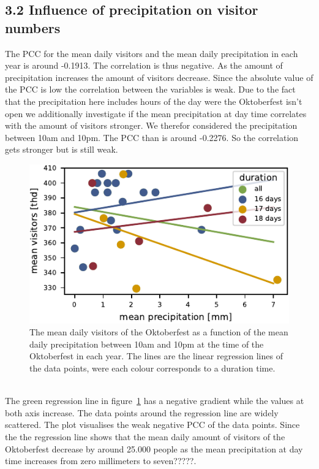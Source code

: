 \documentclass{article}
\theoremstyle{plain}
\theoremstyle{definition}
\theoremstyle{remark}
\begin{document}
\subsection*{3.2 Influence of precipitation on visitor numbers}
The PCC for the mean daily visitors and the mean daily precipitation in each year is around -0.1913. The correlation is thus negative. As the amount of precipitation increases the amount of visitors decrease. Since the absolute value of the PCC is low the correlation between the variables is weak. Due to the fact that the precipitation here includes hours of the day were the Oktoberfest isn't open we additionally investigate if the mean precipitation at day time correlates with the amount of visitors stronger. We therefor considered the precipitation between 10am and 10pm. The PCC than is around -0.2276. So the correlation gets stronger but is still weak.
\begin{figure}[ht]%
  \includegraphics{fig/totalprecipitation.pdf}
  \caption{The mean daily visitors of the Oktoberfest as a function of the mean daily precipitation between 10am and 10pm at the time of the Oktoberfest in each year. The lines are the linear regression lines of the data points, were each colour corresponds to a duration time.}
  \label{figure_precipitation}
\end{figure}\\
\noindent
The green regression line in figure~\ref{figure_precipitation} has a negative gradient while the values at both axis increase. The data points around the regression line are widely scattered. The plot visualises the weak negative PCC of the data points. Since the the regression line shows that the mean daily amount of visitors of the Oktoberfest decrease by around 25.000 people as the mean precipitation at day time increases from zero millimeters to seven?????.\\
\end{document}
